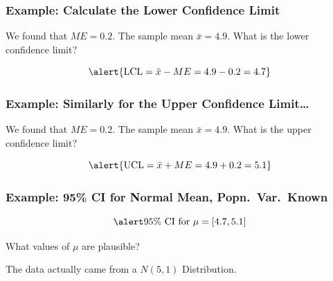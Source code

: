 \documentclass{beamer}
\begin{document}
\begin{frame}
\frametitle{Example: Calculate the Lower Confidence Limit }


\begin{center}
\end{center}

We found that $ME=0.2$. The sample mean $\bar{x} = 4.9$. What is the lower confidence limit?
\pause

\vspace{2em}

	$$\alert{\mbox{LCL} = \bar{x} - ME= 4.9 - 0.2 = 4.7}$$

\end{frame}

\begin{frame}
  \frametitle{Example: Similarly for the Upper Confidence Limit\dots}


\begin{center}
\end{center}

We found that $ME=0.2$. The sample mean $\bar{x} = 4.9$. What is the upper confidence limit?
\pause

\vspace{2em}

	$$\alert{\mbox{UCL} = \bar{x} + ME= 4.9 + 0.2 = 5.1}$$

\end{frame}

\begin{frame}
\frametitle{Example: 95\% CI for Normal Mean, Popn.\ Var.\ Known}

\begin{center}
\end{center}

	$$\alert{\mbox{95\% CI for } \mu = [4.7, 5.1]}$$

What values of $\mu$ are plausible?

\pause
\vspace{1em}

\alert{The data actually came from a $N(5,1)$ Distribution.}

\end{frame}
\end{document}
